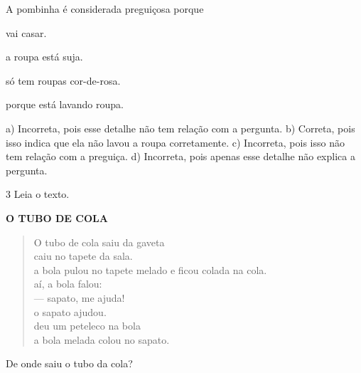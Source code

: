 
A pombinha é considerada preguiçosa porque

\begin{minipage}{.5\textwidth}
\begin{escolha}
	\item vai casar.

	\item a roupa está suja.

	\item só tem roupas cor-de-rosa.

	\item porque está lavando roupa.
\end{escolha}
\end{minipage}

a) Incorreta, pois esse detalhe não tem relação com  a pergunta. 
b) Correta, pois isso indica que ela não lavou a roupa corretamente.
c) Incorreta, pois isso não tem relação com a preguiça.
d) Incorreta, pois apenas esse detalhe não explica a pergunta.  

\num{3} Leia o texto.

\textbf{O TUBO DE COLA}

\begin{verse}
O tubo de cola saiu da gaveta\\
caiu no tapete da sala.\\
a bola pulou no tapete melado e ficou colada na cola.\\
aí, a bola falou:\\
--- sapato, me ajuda!\\
o sapato ajudou.\\
deu um peteleco na bola\\
a bola melada colou no sapato.
\end{verse}



De onde saiu o tubo da cola?

